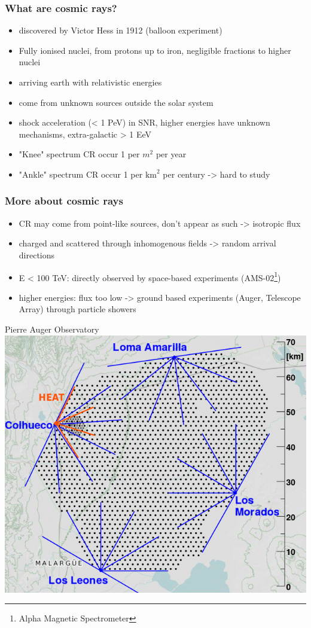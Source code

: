 \documentclass[aspectratio=1610, 9pt]{beamer}
\begin{document}
\begin{frame}\frametitle{What are cosmic rays?}
  \begin{itemize}
    \item discovered by Victor Hess in 1912 (balloon experiment)
    \item Fully ionised nuclei, from protons up to iron, negligible fractions
    to higher nuclei
    \item arriving earth with relativistic energies
    \item come from unknown sources outside the solar system
    \item shock acceleration (< 1 PeV) in SNR, higher energies have unknown
    mechanisms, extra-galactic > 1 EeV
    \item "Knee" spectrum CR occur 1 per $m^2$ per year
    \item "Ankle" spectrum CR occur 1 per $\text{km}^2$ per century -> hard to study
  \end{itemize}
\end{frame}

\begin{frame}\frametitle{More about cosmic rays}
  \begin{itemize}
    \item CR may come from point-like sources, don't appear as such -> isotropic flux
    \item charged and scattered through inhomogenous fields -> random arrival directions
    \item E < 100 TeV: directly observed by space-based experiments (AMS-02\footnote{Alpha Magnetic Spectrometer})
    \item higher energies: flux too low -> ground based experiments
    (Auger, Telescope Array) through particle showers
  \end{itemize}
\end{frame}

\begin{frame}{Pierre Auger Observatory}
  \includegraphics[width=\textwidth]{pierre.png}
\end{frame}
\end{document}

